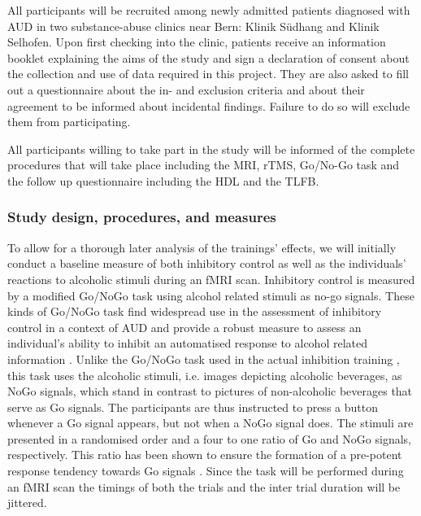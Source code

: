 \documentclass[12pt]{article}
\begin{document}
All participants will be recruited among newly admitted patients diagnosed with AUD in two substance-abuse clinics near Bern: Klinik Südhang and Klinik Selhofen. Upon first checking into the clinic, patients receive an information booklet explaining the aims of the study and sign a declaration of consent about the collection and use of data required in this project. They are also asked to fill out a questionnaire about the in- and exclusion criteria and about their agreement to be informed about incidental findings. Failure to do so will exclude them from participating.

All participants willing to take part in the study will be informed of the complete procedures that will take place including the MRI, rTMS, Go/No-Go task and the follow up questionnaire including the HDL and the TLFB.

\subsubsection{Study design, procedures, and measures}

To allow for a thorough later analysis of the trainings' effects, we will initially conduct a baseline measure of both inhibitory control as well as the individuals' reactions to alcoholic stimuli during an fMRI scan. Inhibitory control is measured by a modified Go/NoGo task using alcohol related stimuli as no-go signals. These kinds of Go/NoGo task find widespread use in the assessment of inhibitory control in a context of AUD and provide a robust measure to assess an individual's ability to inhibit an automatised response to alcohol related information \parencite{amesNeuralCorrelatesGo2014,bowleyEffectsInhibitoryControl2013,roseEffectsAlcoholInhibitory2008,simmondsMetaanalysisGoNogo2008}. Unlike the Go/NoGo task used in the actual inhibition training \parencite{houbenBeerNogoLearning2012}, this task uses the alcoholic stimuli, i.e. images depicting alcoholic beverages, as NoGo signals, which stand in contrast to pictures of non-alcoholic beverages that serve as Go signals. The participants are thus instructed to press a button whenever a Go signal appears, but not when a NoGo signal does. The stimuli are presented in a randomised order and a four to one ratio of Go and NoGo signals, respectively. This ratio has been shown to ensure the formation of a pre-potent response tendency towards Go signals \parencite{amesNeuralCorrelatesGo2014}. Since the task will be performed during an fMRI scan the timings of both the trials and the inter trial duration will be jittered.
\end{document}
